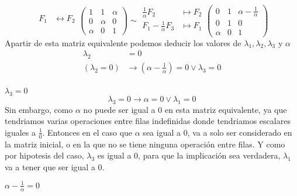 \documentclass{article}
\begin{document}
\begin{enumerate}
\[            \begin{aligned}
                F_1 &\leftrightarrow F_2 \\
            \end{aligned}
            \begin{pmatrix}
                1 & 1 & \alpha \\
                0 & \alpha & 0 \\
                \alpha & 0 & 1
            \end{pmatrix}
            \sim
            \begin{aligned}
                \frac{1}{\alpha}F_2 &\mapsto F_2 \\
                F_1 - \frac{1}{\alpha}F_3 &\mapsto F_1 \\
            \end{aligned}
            \begin{pmatrix}
                0 & 1 & \alpha - \frac{1}{\alpha} \\
                0 & 1 & 0 \\
                \alpha & 0 & 1
            \end{pmatrix}
        \]
        Apartir de esta matriz equivalente podemos deducir los valores de \(\lambda_1, \lambda_2, \lambda_3\) y \(\alpha\)
        \[
            \begin{aligned}
                \lambda_2 &= 0 \\
                (\lambda_2 = 0) &\rightarrow \left(\alpha - \frac{1}{\alpha}\right) = 0 \vee \lambda_3 = 0 \\
            \end{aligned}
        \]
        \ResetCases{}
        \begin{mathcase}{\(\lambda_3 = 0\)}
            \[
                \lambda_3 = 0 \rightarrow \alpha = 0 \vee \lambda_1 = 0
            \]
            Sin embargo, como \(\alpha\) no puede ser igual a 0 en esta matriz equivalente, ya que tendriamos varias operaciones entre filas
            indefinidas donde tendriamos escalares iguales a \(\frac{1}{0}\). 
            Entonces en el caso que \(\alpha\) sea igual a 0, va a solo ser considerado en la matriz inicial, o en la que no se tiene ninguna operación entre filas.
            Y como por hipotesis del caso, \(\lambda_3\) es igual a 0, para que la implicación sea verdadera, \(\lambda_1\) va a tener que ser igual a 0.
        \end{mathcase}
        \begin{mathcase}{\(\alpha - \frac{1}{\alpha} = 0\)}

\end{mathcase}
\end{enumerate}
\end{document}
